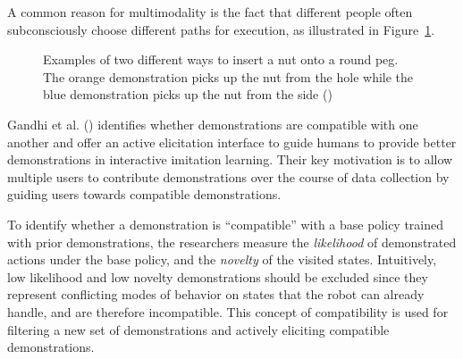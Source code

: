 \documentclass[
  letterpaper,
  numbers=noenddot,
  DIV=11]{scrreprt}
\theoremstyle{definition}
\theoremstyle{plain}
\theoremstyle{plain}
\theoremstyle{remark}
\begin{document}
A common reason for multimodality is the fact that different people
often subconsciously choose different paths for execution, as
illustrated in Figure~\ref{fig-multimodalexecution}.

\begin{figure}


\caption{\label{fig-multimodalexecution}Examples of two different ways
to insert a nut onto a round peg. The orange demonstration picks up the
nut from the hole while the blue demonstration picks up the nut from the
side ()}

\end{figure}%

Gandhi et al. ()
identifies whether demonstrations are compatible with one another and
offer an active elicitation interface to guide humans to provide better
demonstrations in interactive imitation learning. Their key motivation
is to allow multiple users to contribute demonstrations over the course
of data collection by guiding users towards compatible demonstrations.

To identify whether a demonstration is ``compatible'' with a base policy
trained with prior demonstrations, the researchers measure the
\emph{likelihood} of demonstrated actions under the base policy, and the
\emph{novelty} of the visited states. Intuitively, low likelihood and
low novelty demonstrations should be excluded since they represent
conflicting modes of behavior on states that the robot can already
handle, and are therefore incompatible. This concept of compatibility is
used for filtering a new set of demonstrations and actively eliciting
compatible demonstrations.
\end{document}
